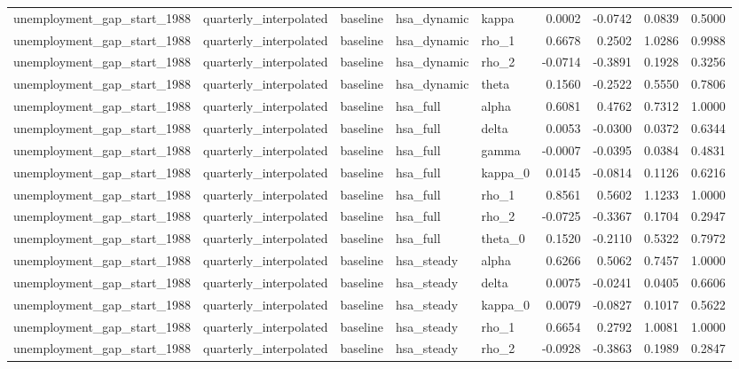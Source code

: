 \begin{tabular}{lllllrrrr}
unemployment\_gap\_start\_1988 & quarterly\_interpolated & baseline & hsa\_dynamic & kappa & 0.0002 & -0.0742 & 0.0839 & 0.5000 \\
unemployment\_gap\_start\_1988 & quarterly\_interpolated & baseline & hsa\_dynamic & rho\_1 & 0.6678 & 0.2502 & 1.0286 & 0.9988 \\
unemployment\_gap\_start\_1988 & quarterly\_interpolated & baseline & hsa\_dynamic & rho\_2 & -0.0714 & -0.3891 & 0.1928 & 0.3256 \\
unemployment\_gap\_start\_1988 & quarterly\_interpolated & baseline & hsa\_dynamic & theta & 0.1560 & -0.2522 & 0.5550 & 0.7806 \\
unemployment\_gap\_start\_1988 & quarterly\_interpolated & baseline & hsa\_full & alpha & 0.6081 & 0.4762 & 0.7312 & 1.0000 \\
unemployment\_gap\_start\_1988 & quarterly\_interpolated & baseline & hsa\_full & delta & 0.0053 & -0.0300 & 0.0372 & 0.6344 \\
unemployment\_gap\_start\_1988 & quarterly\_interpolated & baseline & hsa\_full & gamma & -0.0007 & -0.0395 & 0.0384 & 0.4831 \\
unemployment\_gap\_start\_1988 & quarterly\_interpolated & baseline & hsa\_full & kappa\_0 & 0.0145 & -0.0814 & 0.1126 & 0.6216 \\
unemployment\_gap\_start\_1988 & quarterly\_interpolated & baseline & hsa\_full & rho\_1 & 0.8561 & 0.5602 & 1.1233 & 1.0000 \\
unemployment\_gap\_start\_1988 & quarterly\_interpolated & baseline & hsa\_full & rho\_2 & -0.0725 & -0.3367 & 0.1704 & 0.2947 \\
unemployment\_gap\_start\_1988 & quarterly\_interpolated & baseline & hsa\_full & theta\_0 & 0.1520 & -0.2110 & 0.5322 & 0.7972 \\
unemployment\_gap\_start\_1988 & quarterly\_interpolated & baseline & hsa\_steady & alpha & 0.6266 & 0.5062 & 0.7457 & 1.0000 \\
unemployment\_gap\_start\_1988 & quarterly\_interpolated & baseline & hsa\_steady & delta & 0.0075 & -0.0241 & 0.0405 & 0.6606 \\
unemployment\_gap\_start\_1988 & quarterly\_interpolated & baseline & hsa\_steady & kappa\_0 & 0.0079 & -0.0827 & 0.1017 & 0.5622 \\
unemployment\_gap\_start\_1988 & quarterly\_interpolated & baseline & hsa\_steady & rho\_1 & 0.6654 & 0.2792 & 1.0081 & 1.0000 \\
unemployment\_gap\_start\_1988 & quarterly\_interpolated & baseline & hsa\_steady & rho\_2 & -0.0928 & -0.3863 & 0.1989 & 0.2847 \\
\bottomrule
\end{tabular}
